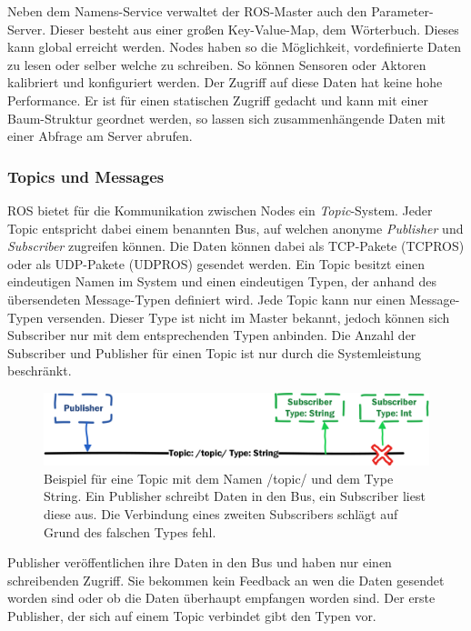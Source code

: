  Neben dem Namens-Service verwaltet der ROS-Master auch den Parameter-Server. Dieser besteht aus einer großen Key-Value-Map, dem Wörterbuch. Dieses kann  global erreicht werden. Nodes haben so die Möglichkeit, vordefinierte Daten zu lesen oder selber welche zu schreiben. So können Sensoren oder Aktoren kalibriert und konfiguriert werden. Der Zugriff auf diese Daten hat keine hohe Performance. Er ist für einen statischen Zugriff gedacht und kann mit einer Baum-Struktur geordnet werden, so lassen sich zusammenhängende Daten mit einer Abfrage am Server abrufen.

\subsubsection{Topics und Messages}
\label{sec:basic-ros-topics}

ROS bietet für die Kommunikation zwischen Nodes ein \textit{Topic}-System. Jeder Topic entspricht dabei einem benannten Bus, auf welchen anonyme \textit{Publisher} und \textit{Subscriber} zugreifen können. Die Daten können dabei als TCP-Pakete (TCPROS) oder als UDP-Pakete (UDPROS) gesendet werden. Ein Topic besitzt einen eindeutigen Namen im System und einen eindeutigen Typen, der anhand des übersendeten Message-Typen definiert wird. Jede Topic kann nur einen Message-Typen versenden. Dieser Type ist nicht im Master bekannt, jedoch können sich Subscriber nur mit dem entsprechenden Typen anbinden. Die Anzahl der Subscriber und Publisher für einen Topic ist nur durch die Systemleistung beschränkt.

\begin{figure}[h]
	\centering
	\includegraphics[scale=0.8]{fig/topic}   
	\caption[Topic Beispiel]{Beispiel für eine Topic mit dem Namen /topic/ und dem Type String. Ein Publisher schreibt Daten in den Bus, ein Subscriber liest diese aus. Die Verbindung eines zweiten Subscribers schlägt auf Grund des falschen Types fehl.}
	\label{fig:basic-ros-topic}
\end{figure}

Publisher veröffentlichen ihre Daten in den Bus und haben nur einen schreibenden Zugriff. Sie bekommen kein Feedback an wen die Daten gesendet worden sind oder ob die Daten überhaupt empfangen worden sind. Der erste Publisher, der sich auf einem Topic verbindet gibt den Typen vor.

